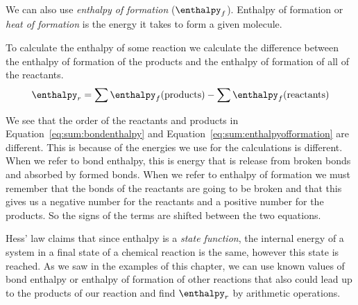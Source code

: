 \documentclass[../mit-general-chemistry.tex]{subfiles}
\begin{document}
We can also use {\em enthalpy of formation} ($\enthalpy_f$). Enthalpy
of formation or {\em heat of formation} is the energy it takes to form
a given molecule.

To calculate the enthalpy of some reaction we calculate the difference
between the enthalpy of formation of the products and the enthalpy of
formation of all of the reactants.
\begin{equation}\label{eq:sum:enthalpyofformation}
  \enthalpy_r = \sum \enthalpy_f(\text{products}) - \sum \enthalpy_f(\text{reactants})
\end{equation}

We see that the order of the reactants and products in
Equation~\ref{eq:sum:bondenthalpy} and
Equation~\ref{eq:sum:enthalpyofformation} are different. This is
because of the energies we use for the calculations is different. When
we refer to bond enthalpy, this is energy that is release from broken
bonds and absorbed by formed bonds. When we refer to enthalpy of
formation we must remember that the bonds of the reactants are going
to be broken and that this gives us a negative number for the
reactants and a positive number for the products. So the signs of the
terms are shifted between the two equations.


Hess' law claims that since enthalpy is a {\em state function}, the
internal energy of a system in a final state of a chemical reaction is
the same, however this state is reached. As we saw in the examples of
this chapter, we can use known values of bond enthalpy or enthalpy of
formation of other reactions that also could lead up to the products
of our reaction and find $\enthalpy_r$ by arithmetic operations.
\end{document}
